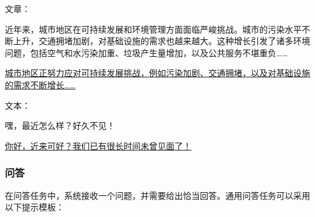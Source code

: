 \vspace{0.5em}
\begin{tcolorbox}

\begingroup
\setlength{\leftskip}{2em}
\setlength{\rightskip}{2em}


\vspace{0.7em}

文章：
\vspace{0.3em}

近年来，城市地区在可持续发展和环境管理方面面临严峻挑战。城市的污染水平不断上升，交通拥堵加剧，对基础设施的需求也越来越大。这种增长引发了诸多环境问题，包括空气和水污染加重、垃圾产生量增加，以及公共服务不堪重负……

\vspace{0.7em}

\uline{城市地区正努力应对可持续发展挑战，例如污染加剧、交通拥堵，以及对基础设施的需求不断增长……}

\endgroup

\end{tcolorbox}
\vspace{0.5em}

\vspace{0.5em}
\begin{tcolorbox}

\begingroup
\setlength{\leftskip}{2em}
\setlength{\rightskip}{2em}


\vspace{0.7em}

文本：
\vspace{0.3em}

嘿，最近怎么样？好久不见！

\vspace{0.7em}

\uline{你好，近来可好？我们已有很长时间未曾见面了！}

\endgroup

\end{tcolorbox}
\vspace{0.5em}

\subsubsection{问答}

\noindent 在问答任务中，系统接收一个问题，并需要给出恰当回答。通用问答任务可以采用以下提示模板：


